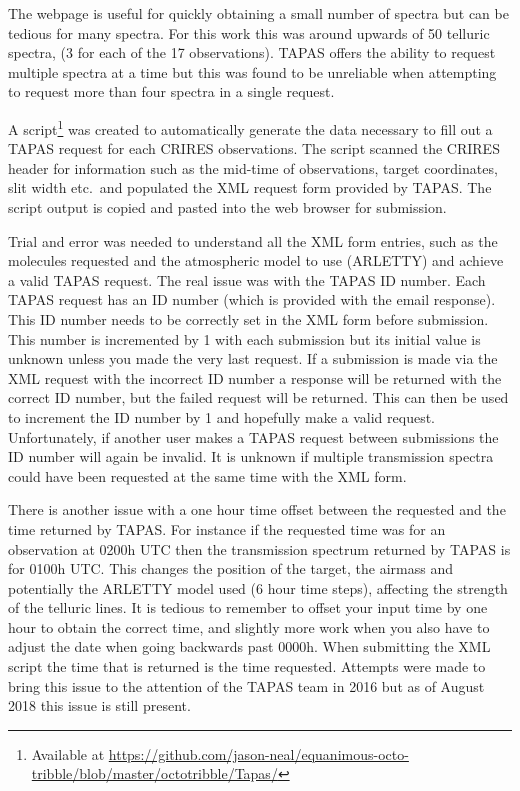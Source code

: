 The webpage is useful for quickly obtaining a small number of spectra but can be tedious for many spectra.
For this work this was around upwards of 50 telluric spectra, (3 for each of the 17 observations).
{TAPAS} offers the ability to request multiple spectra at a time but this was found to be unreliable when attempting to request more than four spectra in a single request.

A script\footnote{Available at \href{https://github.com/jason-neal/equanimous-octo-tribble/blob/master/octotribble/Tapas/}{https://github.com/jason-neal/equanimous-octo-tribble/blob/master/octotribble/Tapas/}} was created to automatically generate the data necessary to fill out a {TAPAS} request for each {CRIRES} observations.
The script scanned the {CRIRES} header for information such as the mid-time of observations, target coordinates, slit width etc.\ and populated the {XML} request form provided by {TAPAS}.
The script output is copied and pasted into the web browser for submission.

Trial and error was needed to understand all the {XML} form entries, such as the molecules requested and the atmospheric model to use ({ARLETTY}) and achieve a valid {TAPAS} request.
The real issue was with the {TAPAS} {{ID}} number.
Each {TAPAS} request has an {ID} number (which is provided with the email response).
This {ID} number needs to be correctly set in the {XML} form before submission.
This number is incremented by 1 with each submission but its initial value is unknown unless you made the very last request.
If a submission is made via the {XML} request with the incorrect {ID} number a response will be returned with the correct {ID} number, but the failed request will be returned.
This can then be used to increment the {ID} number by 1 and hopefully make a valid request.
Unfortunately, if another user makes a {TAPAS} request between submissions the {ID} number will again be invalid.
It is unknown if multiple transmission spectra could have been requested at the same time with the {XML} form.

There is another issue with a one hour time offset between the requested and the time returned by {TAPAS}.
For instance if the requested time was for an observation at 0200h {UTC} then the transmission spectrum returned by {TAPAS} is for 0100h {UTC}.
This changes the position of the target, the airmass and potentially the {ARLETTY} model used (6 hour time steps), affecting the strength of the telluric lines.
It is tedious to remember to offset your input time by one hour to obtain the correct time, and slightly more work when you also have to adjust the date when going backwards past 0000h.
When submitting the {XML} script the time that is returned is the time requested.
Attempts were made to bring this issue to the attention of the {TAPAS} team in 2016 but as of August 2018 this issue is still present.

